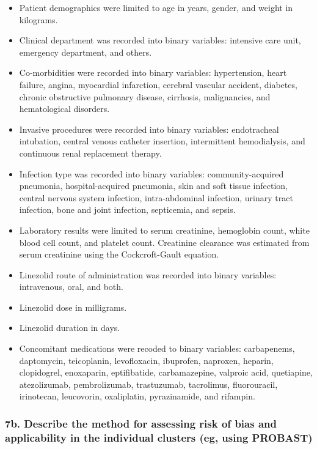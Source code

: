 \documentclass[
  letterpaper,
  DIV=11,
  numbers=noendperiod]{scrartcl}
\providecommand{\tightlist}{%
  \setlength{\itemsep}{0pt}\setlength{\parskip}{0pt}}\usepackage{longtable,booktabs,array}
\begin{document}
\begin{itemize}
\tightlist
\item
  Patient demographics were limited to age in years, gender, and weight
  in kilograms.
\item
  Clinical department was recorded into binary variables: intensive care
  unit, emergency department, and others.
\item
  Co-morbidities were recorded into binary variables: hypertension,
  heart failure, angina, myocardial infarction, cerebral vascular
  accident, diabetes, chronic obstructive pulmonary disease, cirrhosis,
  malignancies, and hematological disorders.
\item
  Invasive procedures were recorded into binary variables: endotracheal
  intubation, central venous catheter insertion, intermittent
  hemodialysis, and continuous renal replacement therapy.
\item
  Infection type was recorded into binary variables: community-acquired
  pneumonia, hospital-acquired pneumonia, skin and soft tissue
  infection, central nervous system infection, intra-abdominal
  infection, urinary tract infection, bone and joint infection,
  septicemia, and sepsis.
\item
  Laboratory results were limited to serum creatinine, hemoglobin count,
  white blood cell count, and platelet count. Creatinine clearance was
  estimated from serum creatinine using the Cockcroft-Gault equation.
\item
  Linezolid route of administration was recorded into binary variables:
  intravenous, oral, and both.
\item
  Linezolid dose in milligrams.
\item
  Linezolid duration in days.
\item
  Concomitant medications were recoded to binary variables: carbapenems,
  daptomycin, teicoplanin, levofloxacin, ibuprofen, naproxen, heparin,
  clopidogrel, enoxaparin, eptifibatide, carbamazepine, valproic acid,
  quetiapine, atezolizumab, pembrolizumab, trastuzumab, tacrolimus,
  fluorouracil, irinotecan, leucovorin, oxaliplatin, pyrazinamide, and
  rifampin.
\end{itemize}

\subsubsection{7b. Describe the method for assessing risk of bias and
applicability in the individual clusters (eg, using
PROBAST)}\label{b.-describe-the-method-for-assessing-risk-of-bias-and-applicability-in-the-individual-clusters-eg-using-probast}
\end{document}
